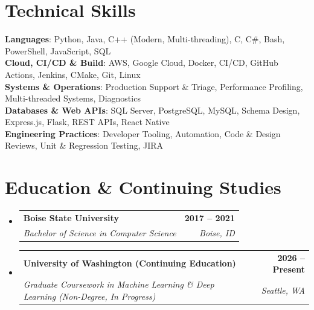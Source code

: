 \documentclass[letterpaper,11pt]{article}
\makeatletter
\newcommand{\resumeSubheading}[4]{
  \vspace{-2pt}\item
    \begin{tabular*}{1.0\textwidth}[t]{l@{\extracolsep{\fill}}r}
      \textbf{#1} & \textbf{\small #2} \\
      \textit{\small#3} & \textit{\small #4} \\
    \end{tabular*}\vspace{-7pt}
}
\newcommand{\resumeSubHeadingListStart}{\begin{itemize}[leftmargin=0.0in, label={}]}
\newcommand{\resumeSubHeadingListEnd}{\end{itemize}}
\makeatother
\begin{document}
\section{Technical Skills}
 \begin{itemize}[leftmargin=0.15in, label={}]
    \small{\item{
     \textbf{Languages}{: Python, Java, C++ (Modern, Multi-threading), C, C\#, Bash, PowerShell, JavaScript, SQL} \\
     \textbf{Cloud, CI/CD \& Build}{: AWS, Google Cloud, Docker, CI/CD, GitHub Actions, Jenkins, CMake, Git, Linux} \\
     \textbf{Systems \& Operations}{: Production Support \& Triage, Performance Profiling, Multi-threaded Systems, Diagnostics} \\
     \textbf{Databases \& Web APIs}{: SQL Server, PostgreSQL, MySQL, Schema Design, Express.js, Flask, REST APIs, React Native} \\
     \textbf{Engineering Practices}{: Developer Tooling, Automation, Code \& Design Reviews, Unit \& Regression Testing, JIRA}
    }}
 \end{itemize}
 \vspace{-12pt}

\section{Education \& Continuing Studies}
  \resumeSubHeadingListStart
    \resumeSubheading
      {Boise State University}{2017 -- 2021}
      {Bachelor of Science in Computer Science}{Boise, ID}
    \resumeSubheading
      {University of Washington (Continuing Education)}{2026 -- Present}
      {Graduate Coursework in Machine Learning \& Deep Learning (Non-Degree, In Progress)}{Seattle, WA}
  \resumeSubHeadingListEnd
\end{document}
